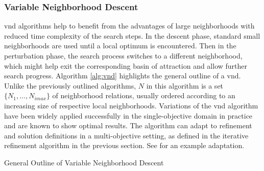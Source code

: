 \subsubsection{Variable Neighborhood Descent}
\Gls{vnd} algorithms help to benefit from the advantages of large neighborhoods with reduced time complexity of the search steps. In the descent phase, standard small neighborhoods are used until a local optimum is encountered. Then in the perturbation phase, the search process switches to a different neighborhood, which might help exit the corresponding basin of attraction and allow further search progress. Algorithm \ref{alg:vnd} highlights the general outline of a \gls{vnd}. Unlike the previously outlined algorithms, $N$ in this algorithm is a set $\{N_1,..., N_{imax}\}$ of neighborhood relations, usually ordered according to an increasing size of respective local neighborhoods. Variations of the \gls{vnd} algorithm have been widely applied successfully in the single-objective domain in practice and are known to show optimal results. The algorithm can adapt to refinement and solution definitions in a multi-objective setting, as defined in the iterative refinement algorithm in the previous section. See \parencite{Duarte2015Multi-objectiveProblems} for an example adaptation.

\begin{algorithm}
  \caption{General Outline of Variable Neighborhood Descent}\label{alg:vnd}
  \end{algorithm}

